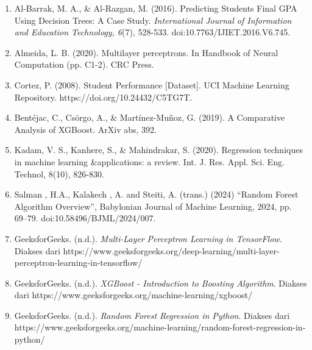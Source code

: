 \begin{enumerate}
    \item Al-Barrak, M. A., \& Al-Razgan, M. {(2016)}. Predicting Students Final GPA Using Decision Trees: A Case Study. \textit{International Journal of Information and Education Technology, 6}{(7)}, 528-533. doi:10.7763{/}IJIET.2016.V6.745.
    \item  Almeida, L. B. (2020). Multilayer perceptrons. In Handbook of Neural Computation (pp. C1-2). CRC Press.
    \item Cortez, P. (2008). Student Performance [Dataset]. UCI Machine Learning Repository. https://doi.org/10.24432/C5TG7T.
    \item Bentéjac, C., Csörgo, A., \& Martínez-Muñoz, G. (2019). A Comparative Analysis of XGBoost. ArXiv abs, 392.
    \item Kadam, V. S., Kanhere, S., \& Mahindrakar, S. (2020). Regression techniques in machine learning \&applications: a review. Int. J. Res. Appl. Sci. Eng. Technol, 8(10), 826-830.
    \item Salman , H.A., Kalakech , A. and Steiti, A. (trans.) (2024) “Random Forest Algorithm Overview”, Babylonian Journal of Machine Learning, 2024, pp. 69–79. doi:10.58496/BJML/2024/007.

    \item GeeksforGeeks. (n.d.). \textit{Multi-Layer Perceptron Learning in TensorFlow}. Diakses dari https://www.geeksforgeeks.org/deep-learning/multi-layer-perceptron-learning-in-tensorflow/
    
    \item GeeksforGeeks. (n.d.). \textit{XGBoost - Introduction to Boosting Algorithm}. Diakses dari https://www.geeksforgeeks.org/machine-learning/xgboost/
    
    \item GeeksforGeeks. (n.d.). \textit{Random Forest Regression in Python}. Diakses dari https://www.geeksforgeeks.org/machine-learning/random-forest-regression-in-python/
\end{enumerate}
